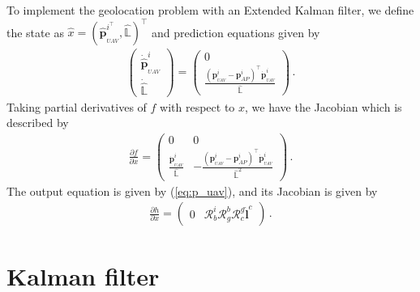 To implement the geolocation problem with an Extended Kalman filter, we define the state as $\hat{x}=(\hat{\boldsymbol{p}}_{_{UAV}}^{i^\top},\hat{\mathbb{L}})^\top$ and prediction equations given by
\begin{align*}
\begin{pmatrix}
\dot{\hat{\boldsymbol{p}}}_{_{UAV}}^i \\
\dot{\hat{\mathbb{L}}}
\end{pmatrix}
=
\begin{pmatrix}
0 \\
\frac{(\boldsymbol{p}_{_{UAV}}^i-\boldsymbol{p}_{AP}^i)^\top\dot{\boldsymbol{p}}_{_{UAV}}^i}{\hat{\mathbb{L}}}
\end{pmatrix}\,.
\end{align*}
Taking partial derivatives of $f$ with respect to $x$, we have the Jacobian which is described by
\begin{align*}
\frac{\partial f}{\partial x}=
\begin{pmatrix}
0 & 0 \\
\frac{\dot{\boldsymbol{p}}_{_{UAV}}^i}{\hat{\mathbb{L}}} & -\frac{(\boldsymbol{p}_{_{UAV}}^i-\boldsymbol{p}_{AP}^i)^\top\dot{\boldsymbol{p}}_{_{UAV}}^i}{\hat{\mathbb{L}}^2}
\end{pmatrix}\,.
\end{align*}
The output equation is given by (\ref{eq:p_uav}), and its Jacobian is given by
\begin{align*}
\frac{\partial h}{\partial x}=
\begin{pmatrix}
0 & \mathcal{R}_b^i\mathcal{R}_g^b\mathcal{R}_c^g\check{\boldsymbol{l}}^c
\end{pmatrix}\,.
\end{align*}

\pagebreak
\section{Kalman filter}{\label{sect:kalman_filter}}

